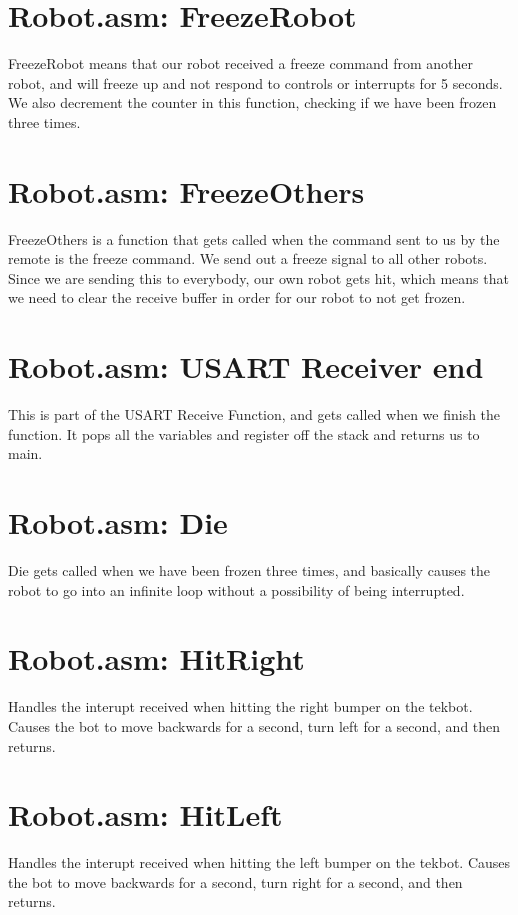 \documentclass[12pt,letterpaper]{article}
\begin{document}
\section{Robot.asm: FreezeRobot}
FreezeRobot means that our robot received a freeze command from another robot, and will freeze up and not respond to controls or interrupts for 5 seconds. We also 
decrement the counter in this function, checking if we have been frozen three times. 

\section{Robot.asm: FreezeOthers}
FreezeOthers is a function that gets called when the command sent to us by the remote is the freeze command. We send out a freeze signal to all other robots. Since 
we are sending this to everybody, our own robot gets hit, which means that we need to clear the receive buffer in order for our robot to not get frozen. 

\section{Robot.asm: USART Receiver end}
This is part of the USART Receive Function, and gets called when we finish the function. It pops all the variables and register off the stack and returns us to main. 

\section{Robot.asm: Die}
Die gets called when we have been frozen three times, and basically causes the robot to go into an infinite loop without a possibility of being interrupted. 

\section{Robot.asm: HitRight}
Handles the interupt received when hitting the right bumper on the tekbot. Causes the bot to move backwards for a second, turn left for a second, and then returns.

\section{Robot.asm: HitLeft}
Handles the interupt received when hitting the left bumper on the tekbot. Causes the bot to move backwards for a second, turn right for a second, and then returns.
\end{document}
